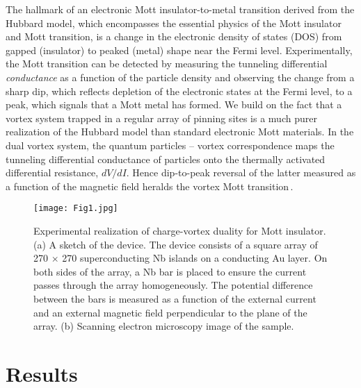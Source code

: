\documentclass[aps,twocolumn,prl,10pt,amsmath,amssymb,nofootinbib,showpacs,superscriptaddress,floatfix]{revtex4-1}
\begin{document}
The hallmark of an electronic Mott insulator-to-metal transition derived from the Hubbard model\cite{Hubbard:1963},
which encompasses
the essential physics of the Mott insulator and Mott transition,
is a change in the electronic density of states (DOS) from gapped (insulator) to peaked  (metal) shape\cite{Imada:1998,Rosenberg,Kotliar:2000} near the Fermi level.
Experimentally, the Mott transition can be detected by 
measuring the tunneling differential \textit{conductance} as a function of the particle density
and observing the change from a sharp dip, which reflects depletion of the electronic states at the Fermi level, to a peak, which signals that a Mott metal has formed. 
We build on the fact that a vortex system 
trapped in a regular array of pinning sites is a much purer realization of the Hubbard model than
standard electronic Mott materials.
In the dual vortex system, the quantum particles -- vortex correspondence maps the tunneling differential conductance of particles onto the thermally activated differential resistance, $dV/dI$. Hence dip-to-peak reversal of the latter measured as a function of the magnetic field heralds the vortex Mott transition\,\cite{Science2015}. 
\begin{figure}[b!]
	\begin{center}
		\begin{center}
			\texttt{[image: Fig1.jpg]}
		\end{center} 
		\caption{Experimental realization of charge-vortex duality for Mott insulator.
			(a) A sketch of the device. The device consists of a square array of 270 $\times$ 270 superconducting Nb islands on a conducting Au layer. On both sides of the array, a Nb bar is placed to ensure the current passes through the array homogeneously. 
			The potential difference between the bars is measured as a function of the external current and an external magnetic field perpendicular to the plane of the array. 
			(b) Scanning electron microscopy image of the sample. 		
		}
		\label{Fig1}
	\end{center}
\end{figure}

\section*{Results}
\end{document}
